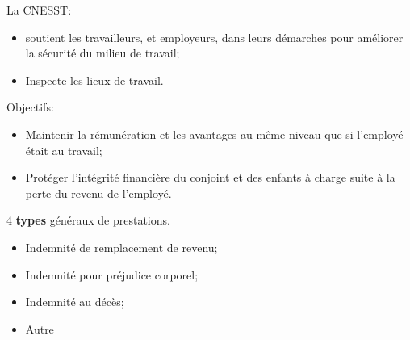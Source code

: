 \documentclass[10pt, french]{article}
\begin{document}
\begin{multicols*}{3}
\begin{definitionNOHFILLsub}[Prévention]
La CNESST:
\begin{itemize}[leftmargin = *]
	\item	soutient les travailleurs, et employeurs, dans leurs démarches pour améliorer la sécurité du milieu de travail;
	\item	Inspecte les lieux de travail.
\end{itemize}
\end{definitionNOHFILLsub}

\begin{definitionNOHFILLsub}[Indemnisation]
Objectifs:
\begin{itemize}[leftmargin = *]
	\item	Maintenir la rémunération et les avantages au même niveau que si l’employé était au travail;
	\item 	Protéger l’intégrité financière du conjoint et des enfants à charge suite à la perte du revenu de l’employé.
\end{itemize}

4 \textbf{types} généraux de prestations.
\begin{itemize}
\item	Indemnité de remplacement de revenu;
\item	Indemnité pour préjudice corporel;
\item 	Indemnité au décès;
\item	Autre
\end{itemize}
\end{definitionNOHFILLsub}


\end{multicols*}
\end{document}
